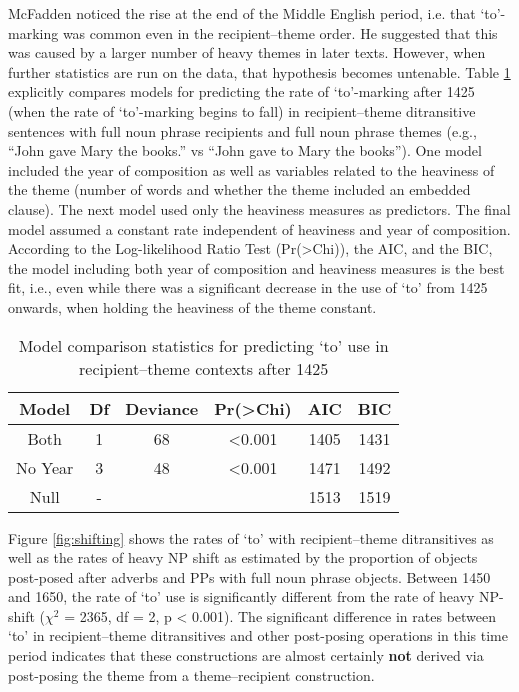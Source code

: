 McFadden noticed the rise at the end of the Middle English period, i.e. that `to'-marking was common even in the recipient--theme order. He suggested that this was caused by a larger number of heavy themes in later texts. However, when further statistics are run on the data, that hypothesis becomes untenable. Table \ref{tab:model-comp} explicitly compares models for predicting the rate of `to'-marking after 1425 (when the rate of `to'-marking begins to fall) in recipient--theme ditransitive sentences with full noun phrase recipients and full noun phrase themes (e.g., ``John gave Mary the books.'' vs ``John gave to Mary the books''). One model included the year of composition as well as variables related to the heaviness of the theme (number of words and whether the theme included an embedded clause). The next model used only the heaviness measures as predictors. The final model assumed a constant rate independent of heaviness and year of composition. According to the Log-likelihood Ratio Test (Pr(>Chi)), the AIC, and the BIC, the model including both year of composition and heaviness measures is the best fit, i.e., even while there was a significant decrease in the use of `to' from 1425 onwards, when holding the heaviness of the theme constant.

\begin{table}[ht!]
	\begin{tabular}{cccccc}
	\hline
	Model	& Df & Deviance & Pr(>Chi) & AIC & BIC\\
	\hline
	Both	& 1  & 68       & <0.001   & 1405 & 1431\\
	No Year & 3  & 48       & <0.001   & 1471 & 1492\\
	Null    & -  &          &          & 1513 & 1519\\
	\hline
	\end{tabular}
	\caption{Model comparison statistics for predicting `to' use in recipient--theme contexts after 1425}
	\label{tab:model-comp}
\end{table}


Figure \ref{fig:shifting} shows the rates of `to' with recipient--theme ditransitives as well as the rates of heavy NP shift as estimated by the proportion of objects post-posed after adverbs and PPs with full noun phrase objects. Between 1450 and 1650, the rate of `to' use is significantly different from the rate of heavy NP-shift ($\chi^2$ =  2365, df = 2, p < 0.001). The significant difference in rates between `to' in recipient--theme ditransitives and other post-posing operations in this time period indicates that these constructions are almost certainly \textbf{not} derived via post-posing the theme from a theme--recipient construction.

